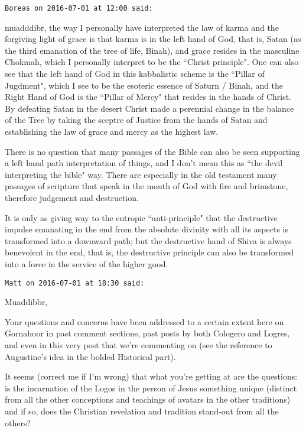 \begin{footnotesize}
\begin{sffamily}
\hfill

\texttt{Boreas on 2016-07-01 at 12:00 said: }

muadddibr, the way I personally have interpreted the law of karma and the forgiving light of grace is that karma is in the left hand of God, that is, Satan (as the third emanation of the tree of life, Binah), and grace resides in the masculine Chokmah, which I personally interpret to be the ``Christ principle". One can also see that the left hand of God in this kabbalistic scheme is the ``Pillar of Jugdment", which I see to be the esoteric essence of Saturn / Binah, and the Right Hand of God is the ``Pillar of Mercy" that resides in the hands of Christ. By defeating Satan in the desert Christ made a perennial change in the balance of the Tree by taking the sceptre of Justice from the hands of Satan and establishing the law of grace and mercy as the highest law.

There is no question that many passages of the Bible can also be seen supporting a left hand path interpretation of things, and I don't mean this as ``the devil interpreting the bible" way. There are especially in the old testament many passages of scripture that speak in the mouth of God with fire and brimstone, therefore judgement and destruction.

It is only as giving way to the entropic ``anti-principle" that the destructive impulse emanating in the end from the absolute divinity with all its aspects is transformed into a downward path; but the destructive hand of Shiva is always benevolent in the end, that is, the destructive principle can also be transformed into a force in the service of the higher good.


\hfill

\texttt{Matt on 2016-07-01 at 18:30 said: }

Muaddibbr,

Your questions and concerns have been addressed to a certain extent here on Gornahoor in past comment sections, past posts by both Cologero and Logres, and even in this very post that we're commenting on (see the reference to Augustine's idea in the bolded Historical part).

It seems (correct me if I'm wrong) that what you're getting at are the questions: is the incarnation of the Logos in the person of Jesus something unique (distinct from all the other conceptions and teachings of avatars in the other traditions) and if so, does the Christian revelation and tradition stand-out from all the others?


\end{sffamily}
\end{footnotesize}
